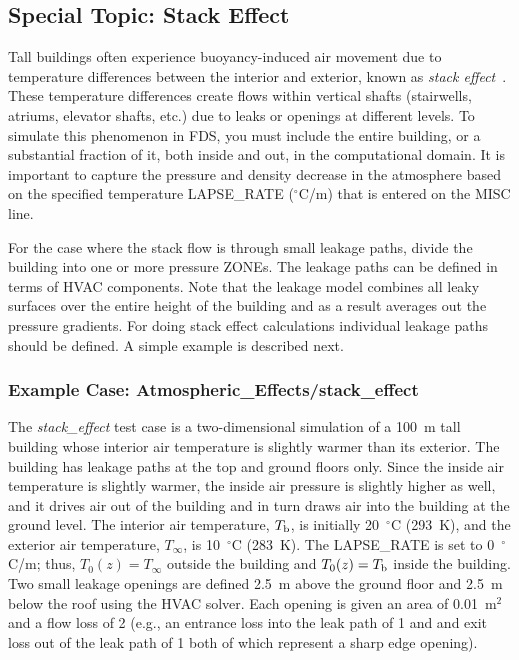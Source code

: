 \documentclass[11pt]{book}
\begin{document}
\subsection{Special Topic: Stack Effect}
\label{info:stackeffect}

Tall buildings often experience buoyancy-induced air movement due to temperature differences between the interior and exterior, known as {\em stack effect}~\cite{Klote_Milke}. These temperature differences create flows within vertical shafts (stairwells, atriums, elevator shafts, etc.) due to leaks or openings at different levels.  To simulate this phenomenon in FDS, you must include the entire building, or a substantial fraction of it, both inside and out, in the computational domain. It
is important to capture the pressure and density decrease in the atmosphere based on the specified temperature {\ct LAPSE\_RATE} ($^\circ$C/m) that is entered on the {\ct MISC} line.

For the case where the stack flow is through small leakage paths, divide the building into one or more pressure {\ct ZONE}s.  The leakage paths can be defined in terms of HVAC components.  Note that the leakage model combines all leaky surfaces over the entire height of the building and as a result averages out the pressure gradients. For doing stack effect calculations individual leakage paths should be defined. A simple example is described next.

\subsubsection{Example Case: Atmospheric\_Effects/stack\_effect}

The {\em stack\_effect} test case is a two-dimensional simulation of a 100~m tall building whose interior air temperature is slightly warmer than its exterior. The building has leakage paths at the top and ground floors only.  Since the inside air temperature is slightly warmer, the inside air pressure is slightly higher as well, and it drives air out of the building and in turn draws air into the building at the ground level.
The interior air temperature, $T_{\rm b}$, is initially 20~$^\circ$C (293~K), and the exterior air temperature, $T_\infty$, is
10~$^\circ$C (283~K). The {\ct LAPSE\_RATE} is set to 0~$^\circ$C/m; thus, $T_0(z)=T_\infty$ outside the building and $T_0(z)=T_{\rm b}$ inside the building. Two small leakage openings are defined 2.5~m above the ground floor and 2.5~m below the roof using the HVAC solver.  Each opening is given an area of 0.01~m$^2$ and a flow loss of 2 (e.g., an entrance loss into the leak path of 1 and and exit loss out of the leak path of 1 both of which represent a sharp edge opening).
\end{document}
